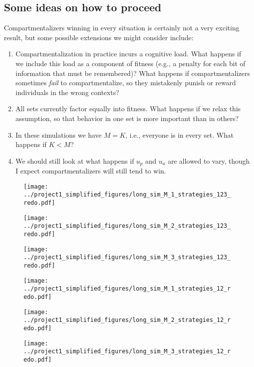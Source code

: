 \documentclass[13pt]{amsart}
\begin{document}
\subsection*{Some ideas on how to proceed}

Compartmentalizers winning in every situation is certainly not a very exciting result, but some possible extensions we might consider include:
\begin{enumerate}
    \item Compartmentalization in practice incurs a cognitive load.
    What happens if we include this load as a component of fitness (e.g., a penalty for each bit of information that must be remembered)?
    What happens if compartmentalizers sometimes \emph{fail} to compartmentalize, so they mistakenly punish or reward individuals in the wrong contexts?
    \item All sets currently factor equally into fitness.
    What happens if we relax this assumption, so that behavior in one set is more important than in others?
    \item In these simulations we have $M = K$, i.e., everyone is in every set.
    What happens if $K < M$?
    \item We should still look at what happens if $u_p$ and $u_a$ are allowed to vary, though I expect compartmentalizers will still tend to win.
\end{enumerate}
\clearpage

\begin{figure}[h]
    \texttt{[image: ../project1\_simplified\_figures/long\_sim\_M\_1\_strategies\_123\_redo.pdf]}
\end{figure}
\begin{figure}[h]
    \texttt{[image: ../project1\_simplified\_figures/long\_sim\_M\_2\_strategies\_123\_redo.pdf]}
\end{figure}
\begin{figure}[h]
    \texttt{[image: ../project1\_simplified\_figures/long\_sim\_M\_3\_strategies\_123\_redo.pdf]}
\end{figure}

\clearpage

\begin{figure}[h]
    \texttt{[image: ../project1\_simplified\_figures/long\_sim\_M\_1\_strategies\_12\_redo.pdf]}
\end{figure}
\begin{figure}[h]
    \texttt{[image: ../project1\_simplified\_figures/long\_sim\_M\_2\_strategies\_12\_redo.pdf]}
\end{figure}
\begin{figure}[h]
    \texttt{[image: ../project1\_simplified\_figures/long\_sim\_M\_3\_strategies\_12\_redo.pdf]}
\end{figure}
\end{document}
